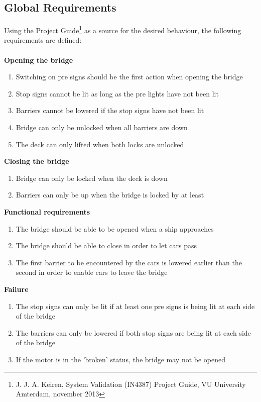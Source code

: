 \subsection{Global Requirements}
\label{sec:glob}

Using the Project Guide\footnote{J. J. A. Keiren, System Validation (IN4387) Project Guide, VU University Amterdam, november 2013} as a source for the desired behaviour, the following requirements are defined:
\\
\\
\textbf{Opening the bridge}
	\begin{enumerate}
  	\item Switching on pre signs should be the first action when opening the bridge
		\item Stop signs cannot be lit as long as the pre lights have not been lit
		\item Barriers cannot be lowered if the stop signs have not been lit
		\item Bridge can only be unlocked when all barriers are down
		\item The deck can only lifted when both locks are unlocked
   \setcounter{enumTemp}{\theenumi}
 \end{enumerate}

\textbf{Closing the bridge}
  \begin{enumerate}
    \setcounter{enumi}{\theenumTemp}
  	\item Bridge can only be locked when the deck is down
		\item Barriers can only be up when the bridge is locked by at least
		\setcounter{enumTemp}{\theenumi}
  \end{enumerate}

\textbf{Functional requirements}
	\begin{enumerate}

			\item The bridge should be able to be opened when a ship approaches
			\item The bridge should be able to close in order to let cars pass
			\item The first barrier to be encountered by the cars is lowered earlier than the second in order to enable cars to leave the bridge
		\setcounter{enumTemp}{\theenumi}
	\end{enumerate}

\textbf{Failure}
	\begin{enumerate}
		\setcounter{enumi}{\theenumTemp}
			\item The stop signs can only be lit if at least one pre signs is being lit at each side of the bridge
			\item The barriers can only be lowered if both stop signs are being lit at each side of the bridge
			\item If the motor is in the 'broken' status, the bridge may not be opened
		\setcounter{enumTemp}{\theenumi}
	\end{enumerate}
